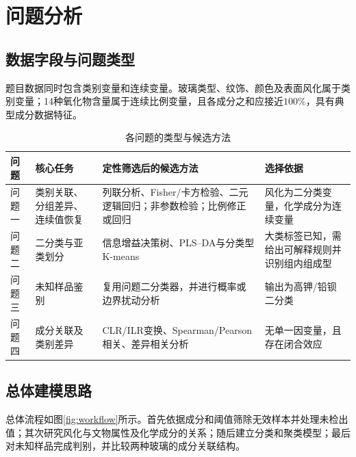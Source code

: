 \section{问题分析}

\subsection{数据字段与问题类型}
题目数据同时包含类别变量和连续变量。玻璃类型、纹饰、颜色及表面风化属于类别变量；14种氧化物含量属于连续比例变量，且各成分之和应接近\(100\%\)，具有典型成分数据特征。

\begin{table}[H]
  \centering
  \caption{各问题的类型与候选方法}
  \label{tab:problem-type}
  \begin{tabularx}{\textwidth}{C{1.5cm} L{3.5cm} L{5.2cm} X}
    \toprule
    问题 & 核心任务 & 定性筛选后的候选方法 & 选择依据 \\
    \midrule
    问题一 & 类别关联、分组差异、连续值恢复 & 列联分析、Fisher/卡方检验、二元逻辑回归；非参数检验；比例修正或回归 & 风化为二分类变量，化学成分为连续变量 \\
    问题二 & 二分类与亚类划分 & 信息增益决策树、PLS--DA与分类型K-means & 大类标签已知，需给出可解释规则并识别组内组成型 \\
    问题三 & 未知样品鉴别 & 复用问题二分类器，并进行概率或边界扰动分析 & 输出为高钾/铅钡二分类 \\
    问题四 & 成分关联及类别差异 & CLR/ILR变换、Spearman/Pearson相关、差异相关分析 & 无单一因变量，且存在闭合效应 \\
    \bottomrule
  \end{tabularx}
\end{table}

\subsection{总体建模思路}
总体流程如图\ref{fig:workflow}所示。首先依据成分和阈值筛除无效样本并处理未检出值；其次研究风化与文物属性及化学成分的关系；随后建立分类和聚类模型；最后对未知样品完成判别，并比较两种玻璃的成分关联结构。


